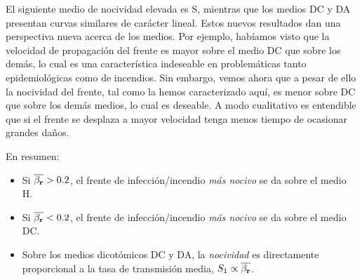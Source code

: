 El siguiente medio de nocividad elevada es S, mientras que los medios DC y DA presentan curvas similares de carácter lineal. Estos nuevos resultados dan una perspectiva 
nueva acerca de los medios. Por ejemplo, habíamos visto que la velocidad de propagación del frente es mayor sobre el medio DC que sobre los demás, lo cual es una 
característica indeseable en problemáticas tanto epidemiológicas como de incendios. Sin embargo, vemos ahora que a pesar de ello la nocividad del frente, tal como la
hemos caracterizado aquí, es menor sobre DC que sobre los demás medios, lo cual es deseable. A modo cualitativo es entendible que si el frente se desplaza a mayor 
velocidad tenga menos tiempo de ocasionar grandes daños. 

En resumen:

\begin{itemize}
    \item Si $\overline{\beta_{\vb r}}>0.2$, el frente de infección/incendio \textit{más nocivo} se da sobre el medio H.
    \item Si $\overline{\beta_{\vb r}}<0.2$, el frente de infección/incendio \textit{más nocivo} se da sobre el medio DC.
    \item Sobre los medios dicotómicos DC y DA, la \textit{nocividad} es directamente proporcional a la tasa de transmisión media, $S_1\propto\overline{\beta_{\vb r}}$.
\end{itemize}